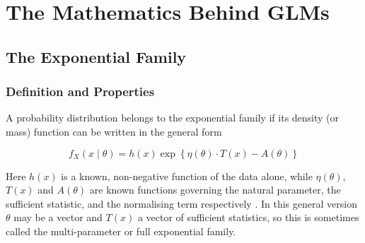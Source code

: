 \part{The Mathematics Behind GLMs}

\chapter{The Exponential Family}

\Exploration
\tbc

\Cognition

\section{Definition and Properties}

A probability distribution belongs to the exponential family if its density (or mass) function can be written in the general form
\begin{mathbox}
\[
f_X(x\mid\theta) = h(x)\exp\left\{\eta(\theta)\cdot T(x) - A(\theta)\right\}
\]
\end{mathbox}
Here $h(x)$ is a known, non-negative function of the data alone, while $\eta(\theta)$, $T(x)$ and $A(\theta)$ are known functions governing the natural parameter, the sufficient statistic, and the normalising term respectively \citep{mccullagh1989}. In this general version $\theta$ may be a vector and $T(x)$ a vector of sufficient statistics, so this is sometimes called the multi-parameter or full exponential family.

